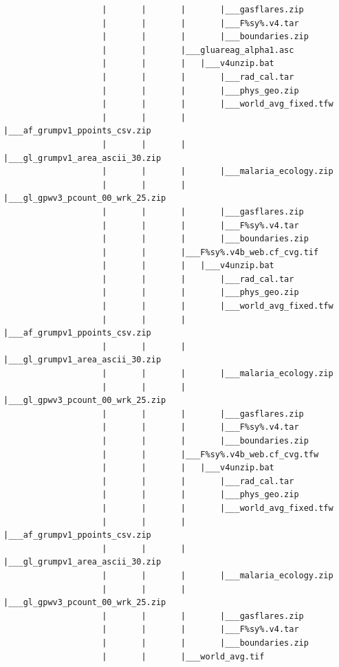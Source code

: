 \documentclass[
]{book}
\begin{document}
\begin{verbatim}
                    |       |       |       |___gasflares.zip
                    |       |       |       |___F%sy%.v4.tar
                    |       |       |       |___boundaries.zip
                    |       |       |___gluareag_alpha1.asc
                    |       |       |   |___v4unzip.bat
                    |       |       |       |___rad_cal.tar
                    |       |       |       |___phys_geo.zip
                    |       |       |       |___world_avg_fixed.tfw
                    |       |       |       |___af_grumpv1_ppoints_csv.zip
                    |       |       |       |___gl_grumpv1_area_ascii_30.zip
                    |       |       |       |___malaria_ecology.zip
                    |       |       |       |___gl_gpwv3_pcount_00_wrk_25.zip
                    |       |       |       |___gasflares.zip
                    |       |       |       |___F%sy%.v4.tar
                    |       |       |       |___boundaries.zip
                    |       |       |___F%sy%.v4b_web.cf_cvg.tif
                    |       |       |   |___v4unzip.bat
                    |       |       |       |___rad_cal.tar
                    |       |       |       |___phys_geo.zip
                    |       |       |       |___world_avg_fixed.tfw
                    |       |       |       |___af_grumpv1_ppoints_csv.zip
                    |       |       |       |___gl_grumpv1_area_ascii_30.zip
                    |       |       |       |___malaria_ecology.zip
                    |       |       |       |___gl_gpwv3_pcount_00_wrk_25.zip
                    |       |       |       |___gasflares.zip
                    |       |       |       |___F%sy%.v4.tar
                    |       |       |       |___boundaries.zip
                    |       |       |___F%sy%.v4b_web.cf_cvg.tfw
                    |       |       |   |___v4unzip.bat
                    |       |       |       |___rad_cal.tar
                    |       |       |       |___phys_geo.zip
                    |       |       |       |___world_avg_fixed.tfw
                    |       |       |       |___af_grumpv1_ppoints_csv.zip
                    |       |       |       |___gl_grumpv1_area_ascii_30.zip
                    |       |       |       |___malaria_ecology.zip
                    |       |       |       |___gl_gpwv3_pcount_00_wrk_25.zip
                    |       |       |       |___gasflares.zip
                    |       |       |       |___F%sy%.v4.tar
                    |       |       |       |___boundaries.zip
                    |       |       |___world_avg.tif

\end{verbatim}
\end{document}
